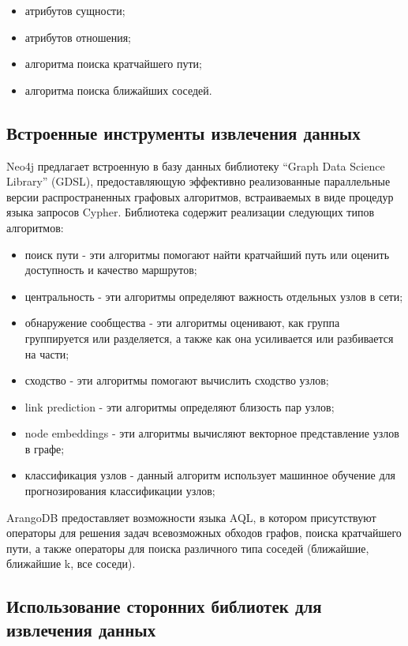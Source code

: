 \begin{itemize}
    \item атрибутов сущности;
    \item атрибутов отношения;
    \item алгоритма поиска кратчайшего пути;
    \item алгоритма поиска ближайших соседей.
\end{itemize}

\subsection{Встроенные инструменты извлечения данных}

Neo4j предлагает встроенную в базу данных библиотеку “Graph Data Science Library” (GDSL), предоставляющую эффективно реализованные
параллельные версии распространенных графовых алгоритмов, встраиваемых в виде процедур языка запросов Cypher. Библиотека содержит
реализации следующих типов алгоритмов:

\begin{itemize}
    \item поиск пути - эти алгоритмы помогают найти кратчайший путь или оценить доступность и качество маршрутов;
    \item центральность - эти алгоритмы определяют важность отдельных узлов в сети;
    \item обнаружение сообщества - эти алгоритмы оценивают, как группа группируется или разделяется, а также как она усиливается или разбивается на части;
    \item сходство - эти алгоритмы помогают вычислить сходство узлов;
    \item link prediction - эти алгоритмы определяют близость пар узлов;
    \item node embeddings - эти алгоритмы вычисляют векторное представление узлов в графе;
    \item классификация узлов - данный алгоритм использует машинное обучение для прогнозирования классификации узлов;
\end{itemize}

ArangoDB предоставляет возможности языка AQL, в котором присутствуют операторы для решения задач всевозможных обходов графов, поиска
кратчайшего пути, а также операторы для поиска различного типа соседей (ближайшие, ближайшие k, все соседи).

\subsection{Использование сторонних библиотек для извлечения данных}


